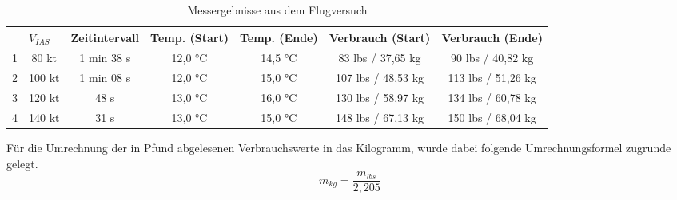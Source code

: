 \begin{table}[h]
	\begin{tabular}{|c|c|c|c|c|c|c|}
		\hline
		& \multicolumn{1}{l|}{\textbf{$V_{IAS}$}} & \multicolumn{1}{l|}{\textbf{Zeitintervall}} & \multicolumn{1}{l|}{\textbf{Temp. (Start)}} & \multicolumn{1}{l|}{\textbf{Temp. (Ende)}} & \multicolumn{1}{l|}{\textbf{Verbrauch (Start)}} & \multicolumn{1}{l|}{\textbf{Verbrauch (Ende)}} \\ \hline
		1 & 80 kt          & 1 min 38 s         & 12,0 °C         & 14,5 °C       & 83 lbs / 37,65 kg        & 90 lbs / 40,82 kg    \\ \hline
		2 & 100 kt         & 1 min 08 s         & 12,0 °C         & 15,0 °C       & 107 lbs / 48,53 kg       & 113 lbs / 51,26 kg   \\ \hline
		3 & 120 kt         & 48 s               & 13,0 °C         & 16,0 °C       & 130 lbs / 58,97 kg       & 134 lbs / 60,78 kg   \\ \hline
		4 & 140 kt         & 31 s               & 13,0  °C        & 15,0 °C       & 148 lbs / 67,13 kg       & 150 lbs / 68,04 kg   \\ \hline
	\end{tabular}
	\caption{Messergebnisse aus dem Flugversuch} \label{tab:messergebnisse}
\end{table}

\noindent Für die Umrechnung der in Pfund abgelesenen Verbrauchswerte in das Kilogramm, wurde dabei folgende Umrechnungsformel zugrunde gelegt.\\

\begin{equation}
m_{kg} = \frac{m_{lbs}}{2,205}
\end{equation}

\newpage
